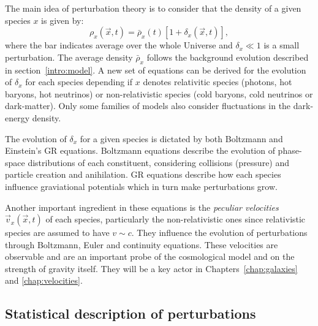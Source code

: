     The main idea of perturbation theory is to consider that
    the density of a given species $x$ is given by:
    \begin{equation}
        \rho_x(\vec{x}, t) = \bar{\rho}_x(t)\left[1 + \delta_x(\vec{x}, t)\right],
    \end{equation}
    where the bar indicates average over the whole Universe and 
    $\delta_x \ll 1$ is a small perturbation. The average density 
    $\bar{\rho}_x$ follows the background evolution described in 
    section~\ref{intro:model}. A new set of equations 
    can be derived for the evolution of $\delta_x$ for each species 
    depending if $x$ denotes relativitic species (photons, hot baryons, hot neutrinos) 
    or non-relativistic species (cold baryons, cold neutrinos or dark-matter). 
    Only some families of models also consider fluctuations in the dark-energy density.

    The evolution of $\delta_x$ for a given species is dictated by both 
    Boltzmann and Einstein's GR equations. Boltzmann equations describe 
    the evolution of phase-space distributions of each constituent, considering
    collisions (pressure) and particle creation and anihilation. GR equations
    describe how each species influence graviational potentials which in turn 
    make perturbations grow.

    Another important ingredient in these equations is the 
    \emph{peculiar velocities} $\vec{v}_x(\vec{x}, t)$ of 
    each species, particularly the non-relativistic ones since 
    relativistic species are assumed to have $v \sim c$. 
    They influence the evolution of perturbations through Boltzmann, Euler
    and continuity equations. These velocities are observable and are an 
    important probe of the cosmological model and on the strength of 
    gravity itself. They will be a key actor in Chapters~\ref{chap:galaxies} and 
    \ref{chap:velocities}. 
    
    \subsection{Statistical description of perturbations}
    \label{intro:lss:statistics}

